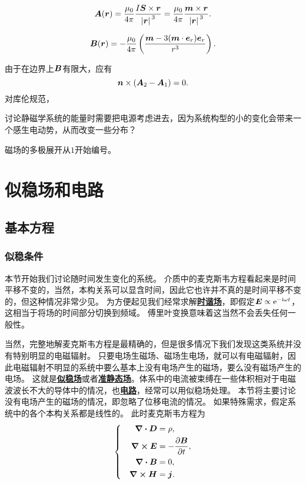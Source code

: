 \documentclass[UTF8, a4paper]{ctexart}
\newcommand*{\ee}{\mathrm{e}}
\newcommand*{\ii}{\mathrm{i}}
\newcommand*{\concept}[1]{\underline{\textbf{#1}}}
\newenvironment{bigcase}{\left\{\quad\begin{aligned}}{\end{aligned}\right.}
\begin{document}
\begin{equation}
    \vb*{A}(\vb*{r}) = \frac{\mu_0}{4\pi} \frac{I \vb*{S} \times \vb*{r}}{\abs*{\vb*{r}}^3} = \frac{\mu_0}{4\pi} \frac{\vb*{m} \times \vb*{r}}{\abs*{\vb*{r}}^3}.
\end{equation}

\begin{equation}
    \vb*{B}(\vb*{r}) = - \frac{\mu_0}{4\pi} \left( \frac{\vb*{m} - 3 (\vb*{m} \cdot \vb*{e}_r) \vb*{e}_r}{r^3} \right).
\end{equation}

由于在边界上$\vb*{B}$有限大，应有
\begin{equation}
    \vb*{n} \times (\vb*{A}_2 - \vb*{A}_1) = 0.
\end{equation}
对库伦规范，

讨论静磁学系统的能量时需要把电源考虑进去，因为系统构型的小的变化会带来一个感生电动势，从而改变一些分布？

磁场的多极展开从$1$开始编号。

\section{似稳场和电路}

\subsection{基本方程}

\subsubsection{似稳条件}

本节开始我们讨论随时间发生变化的系统。
介质中的麦克斯韦方程看起来是时间平移不变的，当然，本构关系可以显含时间，因此它也许并不真的是时间平移不变的，但这种情况非常少见。
为方便起见我们经常求解\concept{时谐场}，即假定$\vb*{E} \propto \ee^{- \ii \omega t}$，这相当于将场的时间部分切换到频域。
傅里叶变换意味着这当然不会丢失任何一般性。

当然，完整地解麦克斯韦方程是最精确的，但是很多情况下我们发现这类系统并没有特别明显的电磁辐射。
只要电场生磁场、磁场生电场，就可以有电磁辐射，因此电磁辐射不明显的系统中要么基本上没有电场产生的磁场，要么没有磁场产生的电场。 %
这就是\concept{似稳场}或者\concept{准静态场}。体系中的电流被束缚在一些体积相对于电磁波波长不大的导体中的情况，也\concept{电路}，经常可以用似稳场处理。
本节将主要讨论没有电场产生的磁场的情况，即忽略了位移电流的情况。
如果特殊需求，假定系统中的各个本构关系都是线性的。
此时麦克斯韦方程为
\begin{equation}
    \begin{bigcase}
        \div{\vb*{D}} &= \rho, \\
        \curl{\vb*{E}} &= - \pdv{\vb*{B}}{t}, \\
        \div{\vb*{B}} &= 0, \\
        \curl{\vb*{H}} &= \vb*{j}.
    \end{bigcase}
    \label{eq:quasi-stable-field}
\end{equation}
\end{document}
